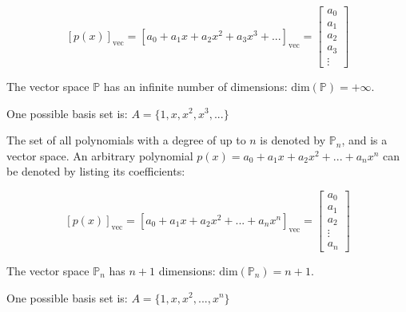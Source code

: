 \documentclass{article}
\begin{document}
\[[p(x)]_{\text{vec}} = [a_0 + a_1 x + a_2 x^2 + a_3 x^3 + ...]_{\text{vec}} = \begin{bmatrix} a_0 \\ a_1 \\ a_2 \\ a_3 \\ \vdots \end{bmatrix}\]

The vector space \(\mathbb{P}\) has an infinite number of dimensions: \(\text{dim}(\mathbb{P}) = +\infty\).

One possible basis set is: \(A = \{1, x, x^2, x^3, ... \}\)

\vspace{5mm}

The set of all polynomials with a degree of up to \(n\) is denoted by \(\mathbb{P}_n\), and is a vector space. An arbitrary polynomial \(p(x) = a_0 + a_1 x + a_2 x^2 + ... + a_n x^n\) can be denoted by listing its coefficients:

\[[p(x)]_{\text{vec}} = [a_0 + a_1 x + a_2 x^2 + ... + a_n x^n]_{\text{vec}} = \begin{bmatrix} a_0 \\ a_1 \\ a_2 \\ \vdots \\ a_n \end{bmatrix}\]

The vector space \(\mathbb{P}_n\) has \(n + 1\) dimensions: \(\text{dim}(\mathbb{P}_n) = n + 1\).

One possible basis set is: \(A = \{1, x, x^2, ..., x^n\}\)

\vspace{5mm}
\end{document}
